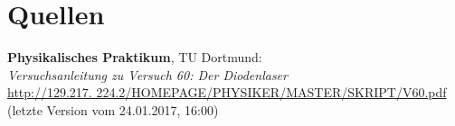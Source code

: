 \documentclass[captions=tableheading]{scrartcl}
\let\oldsection\section
\renewcommand\section{\clearpage\oldsection}
\begin{document}
\section{Quellen}
\begin{enumerate}[label={[\arabic*]}]
\item \label{q:anleitung} \textbf{Physikalisches Praktikum}, TU Dortmund: \\
\textit{Versuchsanleitung zu Versuch 60: Der Diodenlaser} \\
\url{http://129.217.
224.2/HOMEPAGE/PHYSIKER/MASTER/SKRIPT/V60.pdf} (letzte Version vom 24.01.2017, 16:00)
\end{enumerate}
\end{document}
